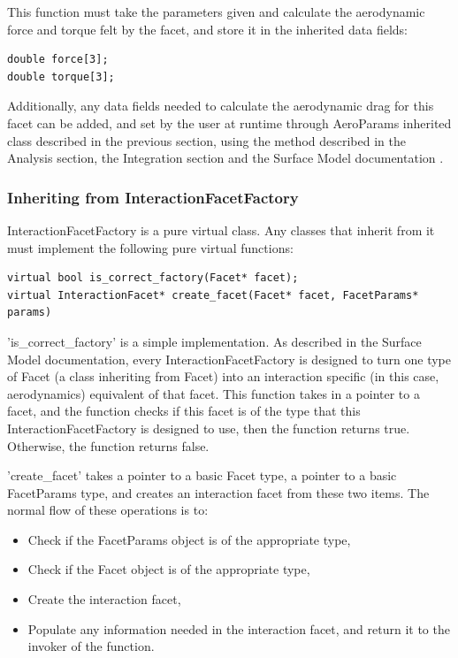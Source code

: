 This function must take the parameters given and calculate the
aerodynamic force and torque felt by the facet, and store it in the inherited data
fields:

\begin{verbatim}
double force[3];
double torque[3];
\end{verbatim}

Additionally, any data fields needed to calculate the aerodynamic drag
for this facet can be added, and set by the user at runtime through
AeroParams inherited class described in the previous section, using
the method described in the Analysis section, the Integration section
and the Surface Model documentation \cite{dynenv:SURFACEMODEL}.

\subsubsection{Inheriting from InteractionFacetFactory}

InteractionFacetFactory is a pure virtual class. Any classes that
inherit from it must implement the following pure virtual functions:

\begin{verbatim}
virtual bool is_correct_factory(Facet* facet);
virtual InteractionFacet* create_facet(Facet* facet, FacetParams* params)
\end{verbatim}

'is\_correct\_factory' is a simple implementation. As described in the
Surface Model documentation, every InteractionFacetFactory is designed
to turn one type of Facet (a class inheriting from Facet) into an
interaction specific (in this case, aerodynamics) equivalent of that
facet. This function takes in a pointer to a facet, and the function
checks if this facet is of the type that this InteractionFacetFactory
is designed to use, then the function returns true. Otherwise, the
function returns false.

'create\_facet' takes a pointer to a basic Facet type, a pointer
to a basic FacetParams type, and creates an interaction facet from
these two items. The normal flow of these operations is to:

\begin{itemize}
\item{Check if the FacetParams object is of the appropriate type,}
\item{Check if the Facet object is of the appropriate type,}
\item{Create the interaction facet,}
\item{Populate any information needed in the interaction facet, and
return it to the invoker of the function}.
\end{itemize}

